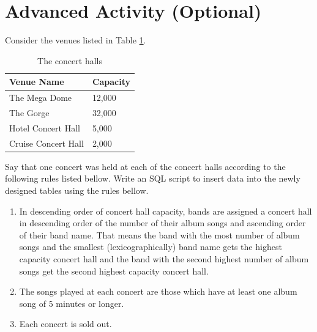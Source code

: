 \documentclass[12pt]{scrartcl}
\begin{document}
\section*{Advanced Activity (Optional)}

Consider the venues listed in Table \ref{table:concertHalls}.

\begin{table}[h]
\centering
\begin{tabular}{l|l}
Venue Name & Capacity \\
\hline\hline
The Mega Dome & 12,000 \\
The Gorge & 32,000 \\
Hotel Concert Hall & 5,000 \\
Cruise Concert Hall & 2,000 \\
\end{tabular}
\caption{The concert halls}
\label{table:concertHalls}
\end{table}

Say that one concert was held at each of the concert halls 
according to the following rules listed bellow. Write an SQL 
script to insert data into the newly designed tables using the 
rules bellow.

\begin{enumerate}
  \item In descending order of concert hall capacity, bands are 
    assigned a concert hall in descending order of the number of 
    their album songs and ascending order of their band name. That 
    means the band with the most number of album songs and the 
    smallest (lexicographically) band name gets the highest capacity 
    concert hall and the band with the second highest number of album 
    songs get the second highest capacity concert hall.
  \item The songs played at each concert are those which have at least 
    one album song of 5 minutes or longer.
  \item Each concert is sold out.
\end{enumerate}
\end{document}
